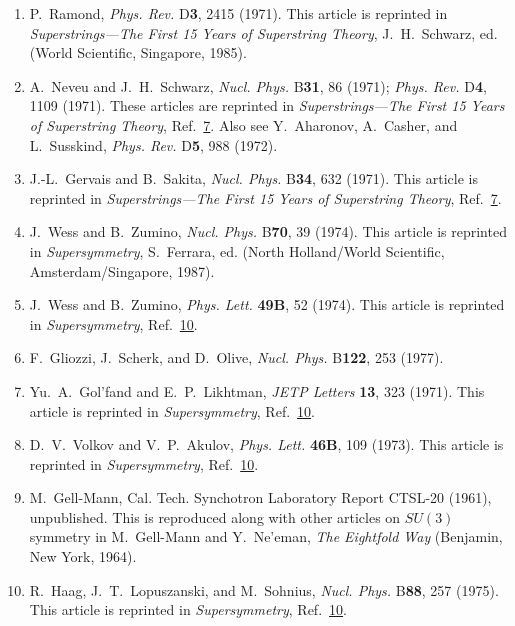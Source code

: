 \begin{enumerate}
  \item {}\label{ch24-ref-7}
  P.~Ramond, \textit{Phys. Rev.} D\textbf{3}, 2415 (1971). This article
  is reprinted in \textit{Superstrings---The First 15 Years of
  Superstring Theory}, J.~H.~Schwarz, ed. (World Scientific, Singapore,
  1985).

  \item {}\label{ch24-ref-8}
  A.~Neveu and J.~H.~Schwarz, \textit{Nucl. Phys.} B\textbf{31}, 86
  (1971); \textit{Phys. Rev.} D\textbf{4}, 1109 (1971). These articles
  are reprinted in \textit{Superstrings---The First 15 Years of
  Superstring Theory}, Ref.~\hyperref[ch24-ref-7]{7}. Also see
  Y.~Aharonov, A.~Casher, and L.~Susskind, \textit{Phys. Rev.}
  D\textbf{5}, 988 (1972).

  \item {}\label{ch24-ref-9}
  J.-L.~Gervais and B.~Sakita, \textit{Nucl. Phys.} B\textbf{34}, 632
  (1971). This article is reprinted in
  \textit{Superstrings---The First 15 Years of Superstring Theory},
  Ref.~\hyperref[ch24-ref-7]{7}.

  \item {}\label{ch24-ref-10}
  J.~Wess and B.~Zumino, \textit{Nucl. Phys.} B\textbf{70}, 39 (1974).
  This article is reprinted in \textit{Supersymmetry}, S.~Ferrara, ed.
  (North Holland/World Scientific, Amsterdam/Singapore, 1987).

  \item {}\label{ch24-ref-11}
  J.~Wess and B.~Zumino, \textit{Phys. Lett.} \textbf{49B}, 52 (1974).
  This article is reprinted in \textit{Supersymmetry},
  Ref.~\hyperref[ch24-ref-10]{10}.

  \item[11a.] \label{ch24-ref-11a}
  F.~Gliozzi, J.~Scherk, and D.~Olive, \textit{Nucl. Phys.}
  B\textbf{122}, 253 (1977).

  \item {}\label{ch24-ref-12}
  Yu.~A.~Gol'fand and E.~P.~Likhtman, \textit{JETP Letters} \textbf{13},
  323 (1971). This article is reprinted in \textit{Supersymmetry},
  Ref.~\hyperref[ch24-ref-10]{10}.

  \item {}\label{ch24-ref-13}
  D.~V.~Volkov and V.~P.~Akulov, \textit{Phys. Lett.} \textbf{46B}, 109
  (1973). This article is reprinted in \textit{Supersymmetry},
  Ref.~\hyperref[ch24-ref-10]{10}.

  \item {}\label{ch24-ref-14}
  M.~Gell-Mann, Cal. Tech. Synchotron Laboratory Report CTSL-20 (1961),
  unpublished. This is reproduced along with other articles on $SU(3)$
  symmetry in M.~Gell-Mann and Y.~Ne'eman, \textit{The Eightfold Way}
  (Benjamin, New York, 1964).

  \item {}\label{ch24-ref-15}
  R.~Haag, J.~T.~Lopuszanski, and M.~Sohnius, \textit{Nucl. Phys.}
  B\textbf{88}, 257 (1975). This article is reprinted in
  \textit{Supersymmetry}, Ref.~\hyperref[ch24-ref-10]{10}.
\end{enumerate}
